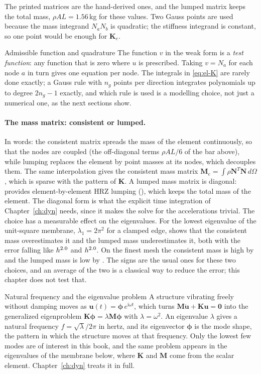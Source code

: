 The printed matrices are the hand-derived ones, and the lumped matrix keeps the total mass, $\rho AL=1.56$\,kg for these values. Two Gauss points are used because the mass integrand $N_aN_b$ is quadratic; the stiffness integrand is constant, so one point would be enough for $\bm K_e$.

\begin{sidenote}{Admissible function and quadrature}
The function $v$ in the weak form is a \emph{test function}: any function that is zero where $u$ is prescribed. Taking $v=N_a$ for each node $a$ in turn gives one equation per node. The integrals in \eqref{eq:el-K} are rarely done exactly; a Gauss rule with $n_g$ points per direction integrates polynomials up to degree $2n_g-1$ exactly, and which rule is used is a modelling choice, not just a numerical one, as the next sections show.
\end{sidenote}

\paragraph{The mass matrix: consistent or lumped.}
In words: the consistent matrix spreads the mass of the element continuously, so that the nodes are coupled (the off-diagonal terms $\rho AL/6$ of the bar above), while lumping replaces the element by point masses at its nodes, which decouples them. The same interpolation gives the consistent mass matrix $\bm M_e=\int\rho\bm N^{T}\bm N\,d\Omega$, which is sparse with the pattern of $\bm K$. A lumped mass matrix is diagonal: \fea{} provides element-by-element HRZ lumping (), which keeps the total mass of the element. The diagonal form is what the explicit time integration of Chapter~\ref{ch:dyn} needs, since it makes the solve for the accelerations trivial. The choice has a measurable effect on the eigenvalues. For the lowest eigenvalue of the unit-square membrane, $\lambda_1=2\pi^2$ for a clamped edge,  shows that the consistent mass overestimates it and the lumped mass underestimates it, both with the error falling like $h^{2.0}$ and $h^{2.0}$. On the finest mesh the consistent mass is high by \cecMassConsFine{} and the lumped mass is low by \cecMassLumpFine{}. The signs are the usual ones for these two choices, and an average of the two is a classical way to reduce the error; this chapter does not test that.

\begin{sidenote}{Natural frequency and the eigenvalue problem}
A structure vibrating freely without damping moves as $\bm u(t)=\bm\phi\,e^{\mathrm i\omega t}$, which turns $\bm M\ddot{\bm u}+\bm K\bm u=\bm0$ into the generalized eigenproblem $\bm K\bm\phi=\lambda\bm M\bm\phi$ with $\lambda=\omega^2$. An eigenvalue $\lambda$ gives a natural frequency $f=\sqrt\lambda/2\pi$ in hertz, and its eigenvector $\bm\phi$ is the mode shape, the pattern in which the structure moves at that frequency. Only the lowest few modes are of interest in this book, and the same problem appears in the eigenvalues of the membrane below, where $\bm K$ and $\bm M$ come from the scalar element. Chapter~\ref{ch:dyn} treats it in full.
\end{sidenote}

